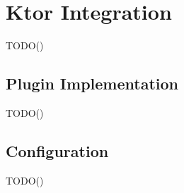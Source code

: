 \resilienceMechanismDefaultConfig


\section{Ktor Integration}\label{sec:rate-limiter-ktor-integration}

TODO()

\subsection{Plugin Implementation}\label{subsec:rate-limiter-plugin}

TODO()

\subsection{Configuration}\label{subsec:rate-limiter-configuration}

TODO()
